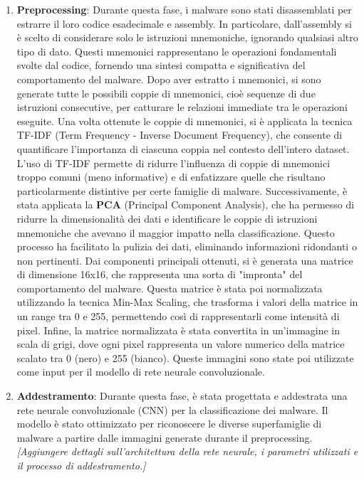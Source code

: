 \begin{enumerate}
    \item \textbf{Preprocessing}: Durante questa fase, i malware sono stati disassemblati per estrarre il loro codice esadecimale e assembly. In particolare, dall'assembly si è scelto di considerare solo le istruzioni mnemoniche, ignorando qualsiasi altro tipo di dato. Questi mnemonici rappresentano le operazioni fondamentali svolte dal codice, fornendo una sintesi compatta e significativa del comportamento del malware. Dopo aver estratto i mnemonici, si sono generate tutte le possibili coppie di mnemonici, cioè sequenze di due istruzioni consecutive, per catturare le relazioni immediate tra le operazioni eseguite.
    Una volta ottenute le coppie di mnemonici, si è applicata la tecnica TF-IDF (Term Frequency - Inverse Document Frequency), che consente di quantificare l'importanza di ciascuna coppia nel contesto dell'intero dataset. L'uso di TF-IDF permette di ridurre l'influenza di coppie di mnemonici troppo comuni (meno informative) e di enfatizzare quelle che risultano particolarmente distintive per certe famiglie di malware. Successivamente, è stata applicata la \textbf{PCA} (Principal Component Analysis), che ha permesso di ridurre la dimensionalità dei dati e identificare le coppie di istruzioni mnemoniche che avevano il maggior impatto nella classificazione. Questo processo ha facilitato la pulizia dei dati, eliminando informazioni ridondanti o non pertinenti.
    Dai componenti principali ottenuti, si è generata una matrice di dimensione 16x16, che rappresenta una sorta di "impronta" del comportamento del malware. Questa matrice è stata poi normalizzata utilizzando la tecnica Min-Max Scaling, che trasforma i valori della matrice in un range tra 0 e 255, permettendo così di rappresentarli come intensità di pixel. Infine, la matrice normalizzata è stata convertita in un'immagine in scala di grigi, dove ogni pixel rappresenta un valore numerico della matrice scalato tra 0 (nero) e 255 (bianco). Queste immagini sono state poi utilizzate come input per il modello di rete neurale convoluzionale.

    \item \textbf{Addestramento}: Durante questa fase, è stata progettata e addestrata una rete neurale convoluzionale (CNN) per la classificazione dei malware. Il modello è stato ottimizzato per riconoscere le diverse superfamiglie di malware a partire dalle immagini generate durante il preprocessing. \textit{[Aggiungere dettagli sull'architettura della rete neurale, i parametri utilizzati e il processo di addestramento.]}
    

\end{enumerate}
